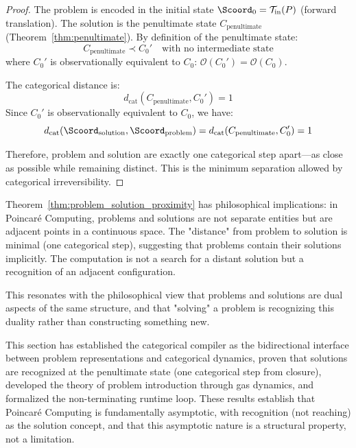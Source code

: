 \begin{proof}
The problem is encoded in the initial state $\Scoord_0 = \mathcal{T}_{\text{in}}(P)$ (forward translation). The solution is the penultimate state $C_{\text{penultimate}}$ (Theorem~\ref{thm:penultimate}). By definition of the penultimate state:
\begin{equation}
C_{\text{penultimate}} \prec C_0' \quad \text{with no intermediate state}
\end{equation}
where $C_0'$ is observationally equivalent to $C_0$: $\mathcal{O}(C_0') = \mathcal{O}(C_0)$.

The categorical distance is:
\begin{equation}
d_{\text{cat}}(C_{\text{penultimate}}, C_0') = 1
\end{equation}
Since $C_0'$ is observationally equivalent to $C_0$, we have:
\begin{equation}
d_{\text{cat}}(\Scoord_{\text{solution}}, \Scoord_{\text{problem}}) = d_{\text{cat}}(C_{\text{penultimate}}, C_0') = 1
\end{equation}

Therefore, problem and solution are exactly one categorical step apart---as close as possible while remaining distinct. This is the minimum separation allowed by categorical irreversibility.
\end{proof}

\begin{remark}
\label{rem:philosophical_implications}
Theorem~\ref{thm:problem_solution_proximity} has philosophical implications: in Poincaré Computing, problems and solutions are not separate entities but are adjacent points in a continuous space. The "distance" from problem to solution is minimal (one categorical step), suggesting that problems contain their solutions implicitly. The computation is not a search for a distant solution but a recognition of an adjacent configuration.

This resonates with the philosophical view that problems and solutions are dual aspects of the same structure, and that "solving" a problem is recognizing this duality rather than constructing something new.
\end{remark}

This section has established the categorical compiler as the bidirectional interface between problem representations and categorical dynamics, proven that solutions are recognized at the penultimate state (one categorical step from closure), developed the theory of problem introduction through gas dynamics, and formalized the non-terminating runtime loop. These results establish that Poincaré Computing is fundamentally asymptotic, with recognition (not reaching) as the solution concept, and that this asymptotic nature is a structural property, not a limitation.

